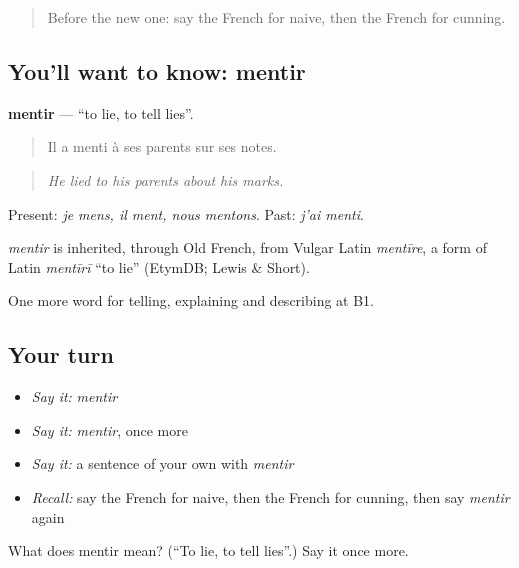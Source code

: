 \label{lesson:FR-C468-mentir}



\begin{quote}
Before the new one: say the French for naive, then the French for cunning.
\end{quote}

\subsection*{You'll want to know: mentir}
\textbf{mentir} — \textquotedblleft{}to lie, to tell lies\textquotedblright{}.

\begin{quote}
Il a menti à ses parents sur ses notes.
\end{quote}

\begin{quote}
\emph{He lied to his parents about his marks.}
\end{quote}

Present: \emph{je mens, il ment, nous mentons}. Past: \emph{j'ai menti}.

\begin{cousinweb}
\emph{mentir} is inherited, through Old French, from Vulgar Latin \emph{mentīre}, a form of Latin \emph{mentīrī} \textquotedblleft{}to lie\textquotedblright{} (EtymDB; Lewis \& Short).
\end{cousinweb}

\begin{grammarlens}[title={What you've built}]
One more word for telling, explaining and describing at B1.
\end{grammarlens}

\subsection*{Your turn}
\begin{itemize}
\raggedright
  \item \emph{Say it:} \emph{mentir}
  \item \emph{Say it:} \emph{mentir}, once more
  \item \emph{Say it:} a sentence of your own with \emph{mentir}
  \item \emph{Recall:} say the French for naive, then the French for cunning, then say \emph{mentir} again
\end{itemize}

\begin{tcolorbox}[breakable,colback=teal!4,colframe=teal!35!black,title={Before you move on}]
What does mentir mean? (\textquotedblleft{}To lie, to tell lies\textquotedblright{}.) Say it once more.
\end{tcolorbox}
